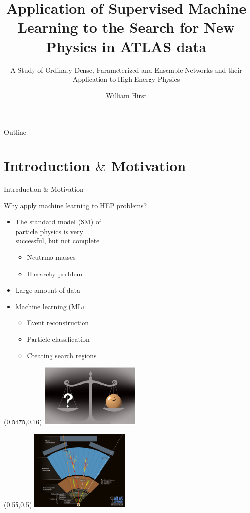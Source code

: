 \documentclass[UKenglish]{beamer}
\author{William Hirst}
\title[Supervised Learning in HEP]{Application of Supervised Machine Learning to the Search for New Physics in ATLAS data}
\subtitle{A Study of Ordinary Dense, Parameterized and Ensemble Networks and their Application to High Energy Physics}
\begin{document}
\begin{frame}{Outline}
    \tableofcontents
\end{frame}


\section{Introduction $\&$ Motivation}
\begin{frame}{Introduction $\&$ Motivation}
    \tableofcontents[currentsection]
\end{frame}

\begin{frame}{Why apply machine learning to HEP problems?}
    \begin{itemize}
        \item The standard model (SM) of \\particle physics is very\\ successful, but not complete
        \begin{itemize}
            \item Neutrino masses 
            \item Hierarchy problem 
        \end{itemize}
        \item Large amount of data
        \item Machine learning (ML)
        \begin{itemize}
            \item Event reconstruction
            \item Particle classification
            \item Creating search regions
        \end{itemize}
    \end{itemize}
    \begin{textblock}{1}(0.5475,0.16)
        \includegraphics[width=0.375\textwidth]{figures/neutrino}
    \end{textblock}
    \begin{textblock}{1}(0.55,0.5)
        \includegraphics[width=0.37\textwidth]{figures/detector}
    \end{textblock}
\end{frame}
\end{document}
